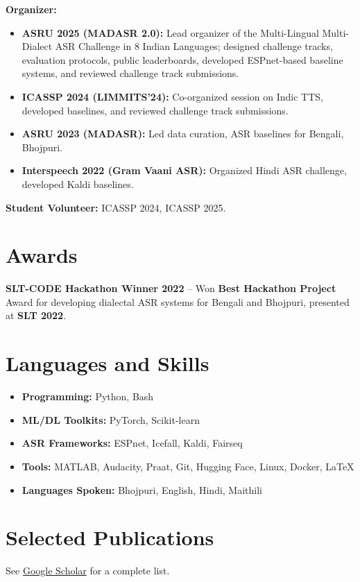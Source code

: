 \documentclass[letterpaper,11pt]{article}
\begin{document}
\textbf{Organizer:}  
\begin{itemize}
    \item \textbf{ASRU 2025 (MADASR 2.0):} Lead organizer of the Multi-Lingual Multi-Dialect ASR Challenge in 8 Indian Languages; designed challenge tracks, evaluation protocols, public leaderboards, developed ESPnet-based baseline systems, and reviewed challenge track submissions.
    \item \textbf{ICASSP 2024 (LIMMITS’24):} Co-organized session on Indic TTS, developed baselines, and reviewed challenge track submissions.
    \item \textbf{ASRU 2023 (MADASR):} Led data curation, ASR baselines for Bengali, Bhojpuri.
    \item \textbf{Interspeech 2022 (Gram Vaani ASR):} Organized Hindi ASR challenge, developed Kaldi baselines.
\end{itemize}

\textbf{Student Volunteer:} ICASSP 2024, ICASSP 2025.  
  \vspace{-1mm}

\section{Awards}
\textbf{SLT-CODE Hackathon Winner 2022} – Won \textbf{Best Hackathon Project} Award for developing dialectal ASR systems for Bengali and Bhojpuri, presented at \textbf{SLT 2022}.

\section{Languages and Skills}
\begin{itemize}[nosep]
    \item \textbf{Programming:} Python, Bash
    \item \textbf{ML/DL Toolkits:} PyTorch, Scikit-learn
    \item \textbf{ASR Frameworks:} ESPnet, Icefall, Kaldi, Fairseq
    \item \textbf{Tools:} MATLAB, Audacity, Praat, Git, Hugging Face, Linux, Docker, \LaTeX
    \item \textbf{Languages Spoken:} Bhojpuri, English, Hindi, Maithili
\end{itemize}

\section{Selected Publications}
{\small See \href{https://scholar.google.com/citations?user=soOjpoYAAAAJ}{Google Scholar} for a complete list.}
\printbibliography[heading=none]
\end{document}
